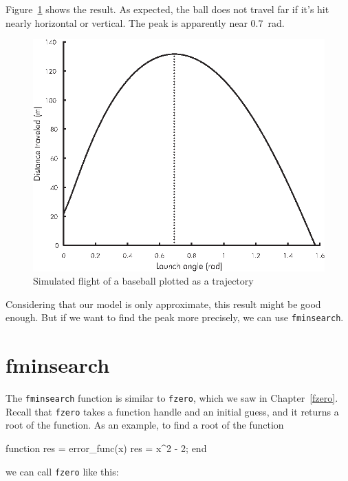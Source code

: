 Figure~\ref{fig:baseball4} shows the result.  As expected, the ball does not travel far if it's hit nearly horizontal or vertical.
The peak is apparently near \SI{0.7}{\radian}.

\begin{figure}[h]
\centerline{\includegraphics[scale=0.8]{images/figure13_02_new.eps}}
\caption{Simulated flight of a baseball plotted as a trajectory}
\label{fig:baseball4}
\end{figure}


Considering that our model is only approximate, this result might be good enough.  But if we want to find the peak more precisely, we can use \lstinline{fminsearch}.


\section{fminsearch}

The \lstinline{fminsearch} function is similar to \lstinline{fzero}, which we saw in Chapter~\ref{fzero}.  Recall that \lstinline{fzero} takes a function handle and an initial guess, and it returns a root of the function.
As an example, to find a root of the function


\begin{code}
function res = error_func(x)
    res = x^2 - 2;
end
\end{code}
we can call \lstinline{fzero} like this:

